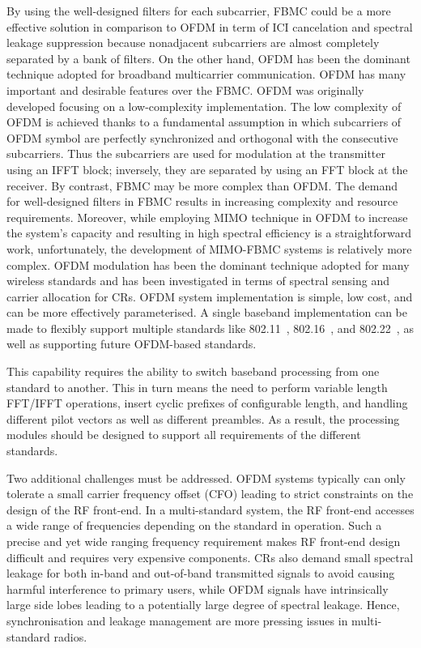 By using the well-designed filters for each subcarrier, FBMC could be a more effective solution in comparison to OFDM in term of ICI cancelation and spectral leakage suppression because nonadjacent subcarriers are almost completely separated by a bank of filters. 
On the other hand, OFDM has been the dominant technique adopted for broadband multicarrier communication.
OFDM has many important and desirable features over the FBMC. OFDM was originally developed focusing on a low-complexity implementation. The low complexity of OFDM is achieved thanks to a fundamental assumption in which subcarriers of OFDM symbol are perfectly synchronized and orthogonal with the consecutive subcarriers. Thus the subcarriers are used for modulation at the transmitter using an IFFT block; inversely, they are separated by using an FFT block at the receiver. By contrast, FBMC may be more complex than OFDM. The demand for well-designed filters in FBMC results in increasing complexity and resource requirements. Moreover, while employing MIMO technique in OFDM to increase the system's capacity and resulting in high spectral efficiency is a straightforward work, unfortunately, the development of MIMO-FBMC systems is relatively more complex.
OFDM modulation has been the dominant technique adopted for many wireless standards and has been investigated in terms of spectral sensing and carrier allocation for CRs.
OFDM system implementation is simple, low cost, and can be more effectively parameterised.
A single baseband implementation can be made to flexibly support multiple standards like 802.11~\cite{IEEE80211}, 802.16~\cite{IEEE80216}, and 802.22~\cite{IEEE80222}, as well as supporting future OFDM-based standards.

This capability requires the ability to switch baseband processing from one standard to another. This in turn means the need to perform variable length FFT/IFFT operations, insert cyclic prefixes of configurable length, and handling different pilot vectors as well as different preambles. As a result, the processing modules should be designed to support all requirements of the different standards.

Two additional challenges must be addressed.
OFDM systems typically can only tolerate a small carrier frequency offset (CFO) leading to strict constraints on the design of the RF front-end.
In a multi-standard system, the RF front-end accesses a wide range of frequencies depending on the standard in operation. Such a precise and yet wide ranging frequency requirement makes RF front-end design difficult and requires very expensive components.
CRs also demand small spectral leakage for both in-band and out-of-band transmitted signals to avoid causing harmful interference to primary users, while OFDM signals have intrinsically large side lobes leading to a potentially large degree of spectral leakage.
Hence, synchronisation and leakage management are more pressing issues in multi-standard radios.

